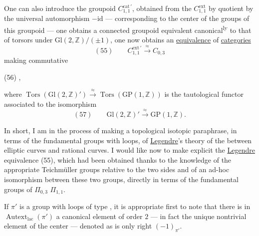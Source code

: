 One can also introduce the groupoid
$C_{1,1}^{\mathrm{cat}\,\prime}$, obtained from the 
$C_{1,1}^{\mathrm{ext}}$ by 
quotient by the universal automorphism $-\mathrm{id}$
--- corresponding to the center  of the
 groups of this groupoid --- one obtains
a connected groupoid equivalent canonical\textsuperscript{ly}
to that of torsors under 
$\mathrm{Gl}(2,\mathbb Z)/(\pm1)$,
 one now obtains an
\uline{equivalence} of \uline{categories}
\[
(55)\qquad C_{1,1}^{\mathrm{ext}\,\prime}\xrightarrow{\approx}C_{0,3}
\]
making commutative

(56)\quad
{},

where $\operatorname{Tors}(\mathrm{Gl}(2,\mathbb Z)')\xrightarrow{\approx}
\operatorname{Tors}(\mathrm{GP}(1,\mathbb Z))$ is
the tautological functor associated to the isomorphism
\[
(57)\qquad \mathrm{Gl}(2,\mathbb Z)'\xrightarrow{\approx}\mathrm{GP}(1,\mathbb Z).
\]

In short, I am in the process of making a
topological isotopic paraphrase, in terms
of the fundamental groups with loops, of
\uline{Legendre}'s theory of the  between
elliptic curves and rational curves.
I would like now to make explicit the
\uline{Legendre} equivalence (55), which had
been obtained thanks to the knowledge of the
appropriate Teichmüller groups relative
to the two sides and of an ad-hoc isomorphism
between these two groups,
directly in terms of the
fundamental groups of  $\Pi_{0,3}$  $\Pi_{1,1}$.

If $\pi'$ is a group with loops of type
, it is appropriate first to note that
there is in $\operatorname{Autext}_{\mathrm{lac}}(\pi')$ a canonical element
of order $2$ --- in fact the unique nontrivial element
of the center --- denoted as is only right $(-1)_{\pi'}$.

